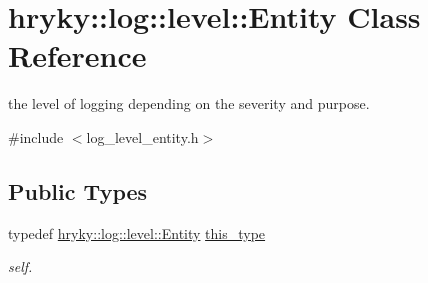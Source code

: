 \hypertarget{classhryky_1_1log_1_1level_1_1_entity}{\section{hryky\-:\-:log\-:\-:level\-:\-:Entity Class Reference}
\label{classhryky_1_1log_1_1level_1_1_entity}
}


the level of logging depending on the severity and purpose.  




{\ttfamily \#include $<$log\-\_\-level\-\_\-entity.\-h$>$}

\subsection*{Public Types}
\begin{DoxyCompactItemize}
\item 
\hypertarget{classhryky_1_1log_1_1level_1_1_entity_a0d62d1d88c70320c6187fc9580077fea}{typedef \hyperlink{classhryky_1_1log_1_1level_1_1_entity}{hryky\-::log\-::level\-::\-Entity} \hyperlink{classhryky_1_1log_1_1level_1_1_entity_a0d62d1d88c70320c6187fc9580077fea}{this\-\_\-type}}\label{classhryky_1_1log_1_1level_1_1_entity_a0d62d1d88c70320c6187fc9580077fea}

\begin{DoxyCompactList}\small\item\em self. \end{DoxyCompactList}\end{DoxyCompactItemize}
